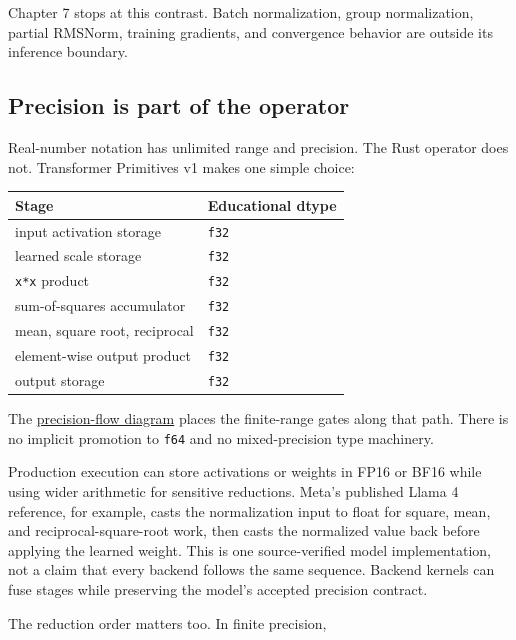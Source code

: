 \documentclass[
  10pt,
]{article}
\newcounter{none} %
\begin{document}
Chapter 7 stops at this contrast. Batch normalization, group
normalization, partial RMSNorm, training gradients, and convergence
behavior are outside its inference boundary.

\subsection{Precision is part of the
operator}\label{precision-is-part-of-the-operator}

Real-number notation has unlimited range and precision. The Rust
operator does not. Transformer Primitives v1 makes one simple choice:

{\def\LTcaptype{none} %
\begin{longtable}[]{@{}ll@{}}
\toprule\noalign{}
Stage & Educational dtype \\
\midrule\noalign{}
\endhead
\bottomrule\noalign{}
\endlastfoot
input activation storage & \texttt{f32} \\
learned scale storage & \texttt{f32} \\
\texttt{x*x} product & \texttt{f32} \\
sum-of-squares accumulator & \texttt{f32} \\
mean, square root, reciprocal & \texttt{f32} \\
element-wise output product & \texttt{f32} \\
output storage & \texttt{f32} \\
\end{longtable}
}

The
\href{https://github.com/hermonai/inside-the-llm-engine/blob/astra-visual-rewrite/diagrams/transformer/normalization-precision-flow.txt}{precision-flow
diagram} places the finite-range gates along that path. There is no
implicit promotion to \texttt{f64} and no mixed-precision type
machinery.

Production execution can store activations or weights in FP16 or BF16
while using wider arithmetic for sensitive reductions. Meta's published
Llama 4 reference, for example, casts the normalization input to float
for square, mean, and reciprocal-square-root work, then casts the
normalized value back before applying the learned weight. This is one
source-verified model implementation, not a claim that every backend
follows the same sequence. Backend kernels can fuse stages while
preserving the model's accepted precision contract.

The reduction order matters too. In finite precision,
\end{document}

